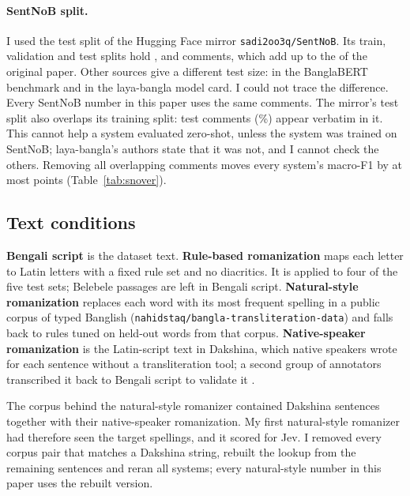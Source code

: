 \documentclass[11pt]{article}
\begin{document}
\paragraph{SentNoB split.}
I used the test split of the Hugging Face mirror \texttt{sadi2oo3q/SentNoB}.
Its train, validation and test splits hold \snMirrorTrain{}, \snMirrorValidation{} and \snMirrorTest{} comments, which add up to the \snPaperTotal{} of the original paper.
Other sources give a different test size: \snBlubTest{} in the BanglaBERT benchmark and \snLayaBanglaCardTest{} in the laya-bangla model card. I could not trace the difference.
Every SentNoB number in this paper uses the same \snFullN{} comments.
The mirror's test split also overlaps its training split: \snTestInTrain{} test comments (\snTrainPct\%) appear verbatim in it.
This cannot help a system evaluated zero-shot, unless the system was trained on SentNoB; laya-bangla's authors state that it was not, and I cannot check the others.
Removing all overlapping comments moves every system's macro-F1 by at most \snMaxShift{} points (Table~\ref{tab:snover}).

\subsection{Text conditions}
\label{sec:conditions}
\textbf{Bengali script} is the dataset text.
\textbf{Rule-based romanization} maps each letter to Latin letters with a fixed rule set and no diacritics. It is applied to four of the five test sets; Belebele passages are left in Bengali script.
\textbf{Natural-style romanization} replaces each word with its most frequent spelling in a public corpus of typed Banglish (\texttt{nahidstaq/bangla-transliteration-data}) and falls back to rules tuned on held-out words from that corpus.
\textbf{Native-speaker romanization} is the Latin-script text in Dakshina, which native speakers wrote for each sentence without a transliteration tool; a second group of annotators transcribed it back to Bengali script to validate it \citep{roark2020dakshina}.

The corpus behind the natural-style romanizer contained \lookupRemoved{} Dakshina sentences together with their native-speaker romanization.
My first natural-style romanizer had therefore seen the target spellings, and it scored \dakLeakJevNat{} for Jev.
I removed every corpus pair that matches a Dakshina string, rebuilt the lookup from the remaining \lookupKept{} sentences and reran all systems; every natural-style number in this paper uses the rebuilt version.
\end{document}
